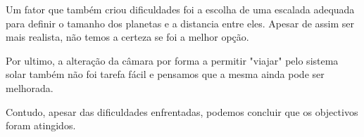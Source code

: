 \documentclass[11pt,a4paper]{report}
\begin{document}
Um fator que também criou dificuldades foi a escolha de uma escalada adequada para definir o tamanho dos planetas e a distancia entre eles. Apesar de assim ser mais realista, não temos a certeza se foi a melhor opção.

Por ultimo, a alteração da câmara por forma a permitir "viajar" pelo sistema solar também não foi tarefa fácil e pensamos que a mesma ainda pode ser melhorada.

Contudo, apesar das dificuldades enfrentadas, podemos concluir que os objectivos foram atingidos.
\end{document}
